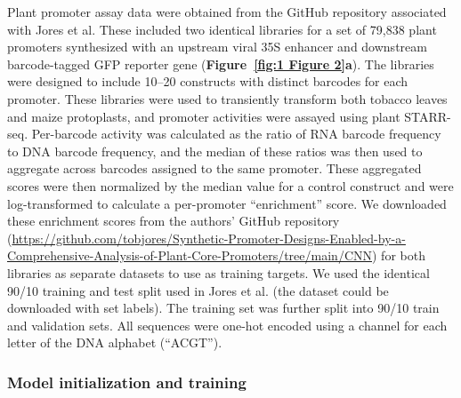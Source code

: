 Plant promoter assay data were obtained from the GitHub repository associated with Jores et al. These included two identical libraries for a set of 79,838 plant promoters synthesized with an upstream viral 35S enhancer and downstream barcode-tagged GFP reporter gene (\textbf{Figure~\ref{fig:1 Figure 2}\textbf{a}}). The libraries were designed to include 10–20 constructs with distinct barcodes for each promoter. These libraries were used to transiently transform both tobacco leaves and maize protoplasts, and promoter activities were assayed using plant STARR-seq\cite{Jores2020-hm}. Per-barcode activity was calculated as the ratio of RNA barcode frequency to DNA barcode frequency, and the median of these ratios was then used to aggregate across barcodes assigned to the same promoter. These aggregated scores were then normalized by the median value for a control construct and were log-transformed to calculate a per-promoter “enrichment” score. We downloaded these enrichment scores from the authors’ GitHub repository (\url{https://github.com/tobjores/Synthetic-Promoter-Designs-Enabled-by-a-Comprehensive-Analysis-of-Plant-Core-Promoters/tree/main/CNN}) for both libraries as separate datasets to use as training targets. We used the identical 90/10 training and test split used in Jores et al. (the dataset could be downloaded with set labels). The training set was further split into 90/10 train and validation sets. All sequences were one-hot encoded using a channel for each letter of the DNA alphabet (“ACGT”).

\subsubsection{Model initialization and training}

